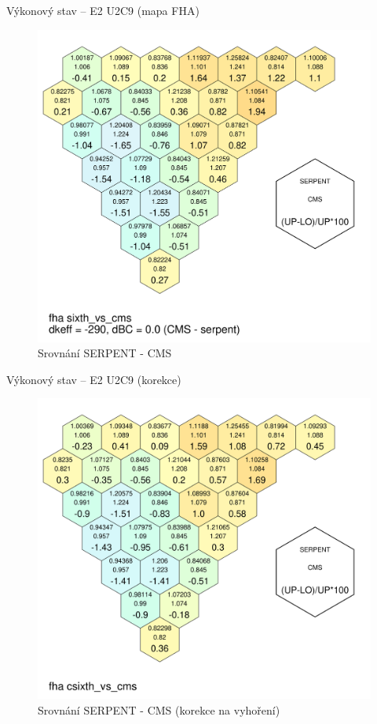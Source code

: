 \documentclass{beamer}
\begin{document}
\begin{frame}{Výkonový stav -- E2 U2C9 (mapa FHA)}
	\begin{figure}[!h]
		\centering
		\includegraphics[scale=0.13]{img/fha_sixth_vs_cms.pdf}
		\caption{\footnotesize Srovnání SERPENT - CMS}
	\end{figure}
\end{frame}

\begin{frame}{Výkonový stav -- E2 U2C9 (korekce)}
	\begin{figure}[!h]
		\centering
		\includegraphics[scale=0.13]{img/fha_csixth_vs_cms.pdf}
		\caption{\footnotesize Srovnání SERPENT - CMS (korekce na vyhoření)}
	\end{figure}
\end{frame}
\end{document}
